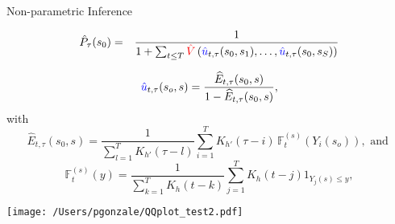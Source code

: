 \documentclass[9pt,compress]{beamer}
\begin{document}
\begin{frame}{Non-parametric Inference}  
\begin{tcolorbox}[title= A plug-in strategy  ]
		\begin{eqnarray*}
			\hat{P}_{\tau}(s_0)  &=& \frac{1}{1 + \sum_{t\leq T} {\color{red} \hat V}\left({\color{blue} \hat u}_{t,\tau}(s_0,s_1), \ldots,  {\color{blue} \hat u}_{t,\tau}(s_0,s_S)\right) }
		\end{eqnarray*} 
\end{tcolorbox}
\begin{tcolorbox}[title= {Method-Of-Moments as $F_t^{(s)}(Y_{\tau}(s_0)) \stackrel{d}{=}  Beta( 
     u_{t,\tau}(s_0,s), 1)$}  ]
\begin{equation*}
			{\color{blue} \hat u}_{t,\tau}(s_o,s) = \frac{\widehat{E}_{t,\tau}(s_0,s)}{1 - \widehat{E}_{t,\tau}(s_0,s) }, 
		\end{equation*}
		with
		\begin{equation*}
			\widehat{E}_{t,\tau}(s_0,s) = \frac{1}{\sum_{l=1}^T K_{h'}(\tau-l) } \sum_{i=1}^T K_{h'}(\tau-i)\,{\mathbb{F}_{t}^{(s)}(Y_{i}(s_o))}, \mbox{ and }
		\end{equation*}
		\begin{equation*}
			\mathbb{F}_{t}^{(s)}(y) = \frac{1}{\sum_{k=1}^T K_{h}(t-k)}\sum_{j=1}^{T} K_{h}(t-j)1_{Y_j(s)\leq y},
		\end{equation*}
   
		\end{tcolorbox}
\end{frame}
%
%
%
\begin{frame}[noframenumbering]%
\begin{center}
\texttt{[image: /Users/pgonzale/QQplot\_test2.pdf]}
 \end{center}    
 \end{frame}
%
%
\end{document}
